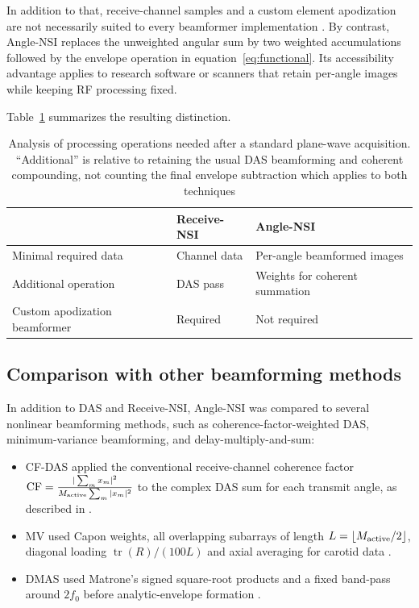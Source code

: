 \documentclass{iopjournal}
\providecommand{\revstart}{}
\providecommand{\revstop}{}
\begin{document}
In addition to that, receive-channel samples and a custom element
apodization are not necessarily suited to every beamformer implementation
\citep{garcia2021must,guan_mach_2026}. By contrast, \revstart Angle-NSI \revstop replaces the
unweighted angular sum by two weighted accumulations followed by the envelope
operation in equation~\eqref{eq:functional}. \revstart Its accessibility
advantage applies to research software or scanners that retain per-angle images while keeping RF processing fixed.\revstop

Table~\ref{tab:cost}
summarizes the resulting distinction.

\begin{table}[h!]
\caption{Analysis of processing operations needed after a standard plane-wave
acquisition. ``Additional'' is relative to retaining the usual DAS beamforming and coherent compounding, not counting the final envelope subtraction which applies to both techniques}
\label{tab:cost}
\centering
\begin{tabularx}{\textwidth}{@{}lXX@{}}
\toprule
 & Receive-NSI & Angle-NSI \\
\midrule
Minimal required data & Channel data & Per-angle beamformed images \\
Additional operation & DAS pass & Weights for coherent summation \\
Custom apodization beamformer & Required & Not required \\
\bottomrule
\end{tabularx}
\end{table}

\subsection{\revstart Comparison with other beamforming methods \revstop}
\revstart In addition to DAS and Receive-NSI, Angle-NSI was compared to several nonlinear beamforming methods, such as coherence-factor-weighted DAS, minimum-variance beamforming, and delay-multiply-and-sum:
\begin{itemize}
    \item CF-DAS applied the conventional receive-channel coherence
factor $\mathrm{CF}=\frac{|\sum_m x_m|^2}
{M_{\rm active}\sum_m|x_m|^2}$ to the complex DAS sum for each transmit angle, as described in \citep{li2003adaptive}.
    \item MV used Capon weights, all overlapping subarrays of length
$L=\lfloor M_{\rm active}/2\rfloor$, diagonal loading
$\operatorname{tr}(R)/(100L)$ and axial averaging for carotid data
\citep{synnevag2007adaptive,synnevag2009benefits}. 
    \item DMAS used Matrone's signed
square-root products and a fixed band-pass around $2f_0$ before analytic-envelope
formation \citep{matrone2015delay}. 
\end{itemize}
 
\end{document}
